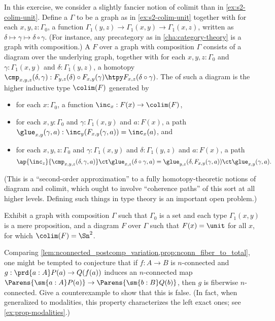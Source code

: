 \begin{ex}\label{ex:s2-colim-unit-2}
  In this exercise, we consider a slightly fancier notion of colimit than in \cref{ex:s2-colim-unit}.
  Define a  $\Gamma$ to be a graph as in \cref{ex:s2-colim-unit} together with for each $x,y,z:\Gamma_0$, a function $\Gamma_1(y,z) \to \Gamma_1(x,y) \to \Gamma_1(x,z)$, written as $\delta\mapsto\gamma \mapsto \delta \circ \gamma$.
  (For instance, any precategory as in \cref{cha:category-theory} is a graph with composition.)
  A  $F$ over a graph with composition $\Gamma$ consists of a diagram over the underlying graph, together with for each $x,y,z:\Gamma_0$ and $\gamma:\Gamma_1(x,y)$ and $\delta:\Gamma_1(y,z)$, a homotopy $\cmp_{x,y,z}(\delta,\gamma) : F_{y,z}(\delta) \circ F_{x,y}(\gamma) \htpy F_{x,z}(\delta\circ\gamma)$.
  The  of such a diagram is the higher inductive type $\colim(F)$ generated by
  \begin{itemize}
  \item for each $x:\Gamma_0$, a function $\inc_x:F(x) \to \colim(F)$,
  \item for each $x,y:\Gamma_0$ and $\gamma:\Gamma_1(x,y)$ and $a:F(x)$, a path $\glue_{x,y}(\gamma,a) : \inc_y(F_{x,y}(\gamma,a)) = \inc_x(a)$, and
  \item for each $x,y,z:\Gamma_0$ and $\gamma:\Gamma_1(x,y)$ and $\delta:\Gamma_1(y,z)$ and $a:F(x)$, a path
    \[ \ap{\inc_z}{\cmp_{x,y,z}(\delta,\gamma,a)} \ct \glue_{x,z}(\delta\circ \gamma,a) = \glue_{y,z}(\delta,F_{x,y}(\gamma,a)) \ct \glue_{x,y}(\gamma,a). \]
  \end{itemize}
  (This is a ``second-order approximation'' to a fully homotopy-theoretic notions of diagram and colimit, which ought to involve ``coherence paths'' of this sort at all higher levels.
  Defining such things in type theory is an important open problem.)

  Exhibit a graph with composition $\Gamma$ such that $\Gamma_0$ is a set and each type $\Gamma_1(x,y)$ is a mere proposition, and a diagram $F$ over $\Gamma$ such that $F(x)=\unit$ for all $x$, for which $\colim(F)=\Sn^2$.
\end{ex}

\begin{ex}\label{ex:fiber-map-not-conn}
  Comparing \cref{lem:nconnected_postcomp_variation,prop:nconn_fiber_to_total}, one might be tempted to conjecture that if $f:A\to B$ is $n$-connected and $g:\prd{a:A} P(a) \to Q(f(a))$ induces an $n$-connected map $\Parens{\sm{a:A} P(a)} \to \Parens{\sm{b:B} Q(b)}$, then $g$ is fiberwise $n$-connected.
  Give a counterexample to show that this is false.
  (In fact, when generalized to modalities, this property characterizes the left exact ones; see \cref{ex:prop-modalities}.)
\end{ex}

